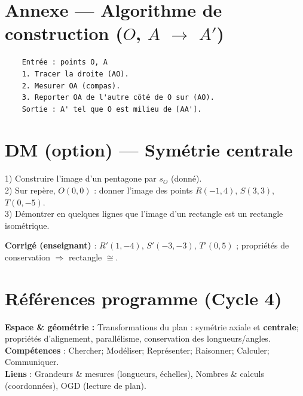 \section*{Annexe — Algorithme de construction ($O$, $A$ $\rightarrow$ $A'$)}
\begin{verbatim}
	Entrée : points O, A
	1. Tracer la droite (AO).
	2. Mesurer OA (compas).
	3. Reporter OA de l'autre côté de O sur (AO).
	Sortie : A' tel que O est milieu de [AA'].
\end{verbatim}

\newpage
\section*{DM (option) — Symétrie centrale}
\begin{exercice}
	1) Construire l’image d’un pentagone par $s_O$ (donné).\\
	2) Sur repère, $O(0,0)$ : donner l’image des points $R( {-}1,4)$, $S(3,3)$, $T(0, {-}5)$.\\
	3) Démontrer en quelques lignes que l’image d’un rectangle est un rectangle isométrique.
\end{exercice}
\textbf{Corrigé (enseignant)} : $R'(1,{-}4)$, $S'({-}3,{-}3)$, $T'(0,5)$ ; propriétés de conservation $\Rightarrow$ rectangle $\cong$.

\section*{Références programme (Cycle 4)}
\textbf{Espace \& géométrie :} Transformations du plan : symétrie axiale et \textbf{centrale}; propriétés d’alignement, parallélisme, conservation des longueurs/angles.\\
\textbf{Compétences} : Chercher; Modéliser; Représenter; Raisonner; Calculer; Communiquer.\\
\textbf{Liens} : Grandeurs \& mesures (longueurs, échelles), Nombres \& calculs (coordonnées), OGD (lecture de plan).
